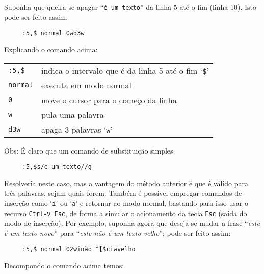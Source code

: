 Suponha que queira-se apagar ``{\tt é um texto}'' da linha 5 até o fim (linha
10). Isto pode ser feito assim:

\begin{verbatim}
     :5,$ normal 0wd3w
\end{verbatim}

Explicando o comando acima:

\begin{table}[htb]\begin{center} \begin{tabular}{ll} \hline
     \verb|:5,$| & indica o intervalo que é da linha 5 até o fim `\verb|$|'\\
     \verb|normal| & executa em modo normal\\
     \verb|0| & move o cursor para o começo da linha\\
     \verb|w| & pula uma palavra\\
     \verb|d3w| & apaga 3 palavras `\verb|w|'\\
\hline \end{tabular}\end{center}\end{table}

Obs: É claro que um comando de substituição simples

\begin{verbatim}
     :5,$s/é um texto//g
\end{verbatim}

Resolveria neste caso, mas a vantagem do método anterior é que
é válido para três palavras, sejam quais forem.  
Também é possível empregar comandos de inserção como `{\tt i}' ou `{\tt a}' e
retornar ao modo normal, bastando para isso usar o recurso \verb|Ctrl-v Esc|,
de forma a simular o acionamento da tecla \verb|Esc| (saída do modo de
inserção). Por exemplo, suponha agora que deseja-se mudar a frase ``{\em este
é um texto novo}'' para ``{\em este não é um texto velho}''; pode ser feito
assim:

\begin{verbatim}
     :5,$ normal 02winão ^[$ciwvelho
\end{verbatim}

Decompondo o comando acima temos:

